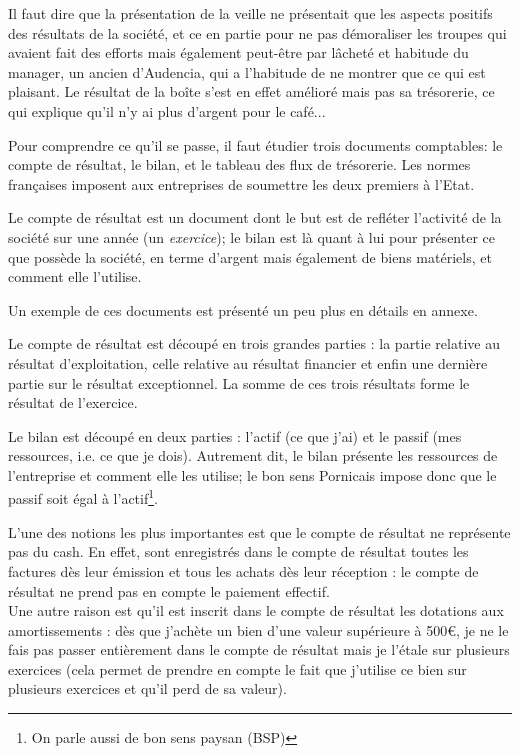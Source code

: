 Il faut dire que la présentation de la veille ne présentait 
que les aspects positifs des résultats de la société, et 
ce en partie pour ne pas démoraliser les troupes qui avaient 
fait des efforts mais également peut-être par lâcheté et 
habitude du manager, un ancien d'Audencia, qui a l'habitude de 
ne montrer que ce qui est plaisant. 
Le résultat de la boîte s'est en effet amélioré mais pas sa 
trésorerie, ce qui explique qu'il n'y ai plus d'argent pour 
le café... 

Pour comprendre ce qu'il se passe, il faut étudier trois 
documents comptables: le compte de résultat, le bilan, et le 
tableau des flux de trésorerie. 
Les normes françaises imposent aux entreprises de soumettre 
les deux premiers à l'Etat.

Le compte de résultat est un document dont le but est de 
refléter l'activité de la société sur une année (un \emph{exercice});
le bilan est là quant à lui pour 
présenter ce que possède la société, en terme d'argent mais 
également de biens matériels, et comment elle l'utilise.

Un exemple de ces documents est présenté un peu plus en détails en annexe.

Le compte de résultat est découpé en trois grandes parties : 
la partie relative au résultat d'exploitation, celle relative 
au résultat financier et enfin une dernière partie sur le 
résultat exceptionnel. La somme de ces trois résultats forme 
le résultat de l'exercice.

Le bilan est découpé en deux parties : l'actif (ce que j'ai) 
et le passif (mes ressources, i.e. ce que je dois).
Autrement dit, le bilan présente les ressources de l'entreprise 
et comment elle les utilise; le bon sens Pornicais impose donc que 
le passif soit égal à l'actif\footnote{On parle aussi de bon sens paysan (BSP)}.

L'une des notions les plus importantes est que le compte 
de résultat ne représente pas du cash. En effet, sont 
enregistrés dans le compte de résultat toutes les factures dès 
leur émission et tous les achats dès leur réception : le 
compte de résultat ne prend pas en compte le paiement effectif. \\
\hspace*{\parindent}Une autre raison est qu'il est inscrit dans le compte de 
résultat les dotations aux amortissements : dès que j'achète un bien 
d'une valeur supérieure à 500\euro\/, je ne le fais pas passer 
entièrement dans le compte de résultat mais je l'étale sur 
plusieurs exercices (cela permet de prendre en compte le fait 
que j'utilise ce bien sur plusieurs exercices et qu'il perd de sa 
valeur).

